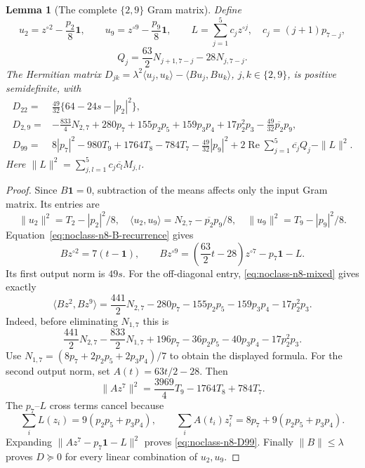 \documentclass[11pt]{article}
\newtheorem{lemma}[theorem]{Lemma}
\theoremstyle{remark}
\numberwithin{equation}{section}
\begin{document}
\begin{lemma}[The complete $\{2,9\}$ Gram matrix]
\label{lem:noclass-n8-29}
Define
\[
 u_2=z^{\circ2}-\frac{p_2}{8}\mathbf1,\qquad
 u_9=z^{\circ9}-\frac{p_9}{8}\mathbf1,\qquad
 L=\sum_{j=1}^5c_jz^{\circ j},\quad c_j=(j+1)p_{7-j},
\]
\[
 Q_j=\frac{63}{2}N_{j+1,7-j}-28N_{j,7-j}.
\]
The Hermitian matrix
$D_{jk}=\lambda^2\langle u_j,u_k\rangle-
\langle Bu_j,Bu_k\rangle$, $j,k\in\{2,9\}$, is positive
semidefinite, with
\begin{align}
 D_{22}={}&\frac{49}{32}\{64-24s-|p_2|^2\},
 \label{eq:noclass-n8-D22}\\
 D_{2,9}={}&-\frac{833}{4}N_{2,7}+280p_7+155p_2p_5
 +159p_3p_4+17p_2^2p_3-\frac{49}{32}\overline{p_2}p_9,
 \label{eq:noclass-n8-D29}\\
 D_{99}={}&8|p_7|^2-980T_9+1764T_8-784T_7
 -\frac{49}{32}|p_9|^2
 +2\operatorname{Re}\sum_{j=1}^5\overline{c_j}Q_j-\|L\|^2.
 \label{eq:noclass-n8-D99}
\end{align}
Here $\|L\|^2=\sum_{j,l=1}^5c_j\overline{c_l}M_{j,l}$.
\end{lemma}
\begin{proof}
Since $B\mathbf1=0$, subtraction of the means affects only the
input Gram matrix. Its entries are
\[
 \|u_2\|^2=T_2-|p_2|^2/8,\quad
 \langle u_2,u_9\rangle=N_{2,7}-\overline{p_2}p_9/8,
 \quad\|u_9\|^2=T_9-|p_9|^2/8.
\]
Equation~\eqref{eq:noclass-n8-B-recurrence} gives
\[
 Bz^{\circ2}=7(t-\mathbf1),\qquad
 Bz^{\circ9}=\left(\frac{63}{2}t-28\right)z^{\circ7}
              -p_7\mathbf1-L.
\]
Its first output norm is $49s$. For the off-diagonal entry,
\eqref{eq:noclass-n8-mixed} gives exactly
\[
 \langle Bz^2,Bz^9\rangle
 =\frac{441}{2}N_{2,7}-280p_7-155p_2p_5-159p_3p_4-17p_2^2p_3.
\]
Indeed, before eliminating $N_{1,7}$ this is
\[
 \frac{441}{2}N_{2,7}-\frac{833}{2}N_{1,7}+196p_7
 -36p_2p_5-40p_3p_4-17p_2^2p_3.
\]
Use $N_{1,7}=(8p_7+2p_2p_5+2p_3p_4)/7$ to obtain the
displayed formula. For the second output norm, set $A(t)=63t/2-28$.
Then
\[
 \|Az^7\|^2=\frac{3969}{4}T_9-1764T_8+784T_7.
\]
The $p_7$--$L$ cross terms cancel because
\[
 \sum_iL(z_i)=9(p_2p_5+p_3p_4),\qquad
 \sum_iA(t_i)z_i^7=8p_7+9(p_2p_5+p_3p_4).
\]
Expanding $\|Az^7-p_7\mathbf1-L\|^2$ proves
\eqref{eq:noclass-n8-D99}. Finally $\|B\|\le\lambda$ proves
$D\succeq0$ for every linear combination of $u_2,u_9$.
\end{proof}
\end{document}

